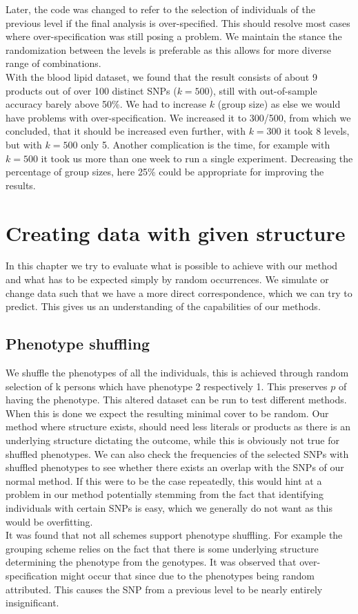 \documentclass[letterpaper, 11pt]{article}
\begin{document}
Later, the code was changed to refer to the selection of individuals of the previous level if the final analysis is over-specified. This should resolve most cases where over-specification was still posing a problem. We maintain the stance the randomization between the levels is preferable as this allows for more diverse range of combinations.\\

With the blood lipid dataset, we found that the result consists of about 9 products out of over 100 distinct SNPs ($k=500$), still with out-of-sample accuracy barely above 50\%. We had to increase $k$ (group size) as else we would have problems with over-specification. We increased it to 300/500, from which we concluded, that it should be increased even further, with $k=300$ it took 8 levels, but with $k=500$ only 5. Another complication is the time, for example with $k=500$ it took us more than one week to run a single experiment. Decreasing the percentage of group sizes, here 25\% could be appropriate for improving the results.

\section{Creating data with given structure}
In this chapter we try to evaluate what is possible to achieve with our method and what has to be expected simply by random occurrences. We simulate or change data such that we have a more direct correspondence, which we can try to predict. This gives us an understanding of the capabilities of our methods.
\subsection{Phenotype shuffling}
We shuffle the phenotypes of all the individuals, this is achieved through random selection of k persons which have phenotype 2 respectively 1. This preserves $p$ of having the phenotype. 
This altered dataset can be run to test different methods. When this is done we expect the resulting minimal cover to be random. 
Our method where structure exists, should need less literals or products as there is an underlying structure dictating the outcome, while this is obviously not true for shuffled phenotypes. We can also check the frequencies of the selected SNPs with shuffled phenotypes to see whether there exists an overlap with the SNPs of our normal method. If this were to be the case repeatedly, this  would hint at a problem in our method potentially stemming from the fact that identifying individuals with certain SNPs is easy, which we generally do not want as this would be overfitting.\\
It was found that not all schemes support phenotype shuffling. For example the grouping scheme relies on the fact that there is some underlying structure determining the phenotype from the  genotypes. It was observed that over-specification might occur that since due to the phenotypes being random attributed. This causes the SNP from a previous level to be nearly entirely insignificant. \\
\end{document}
